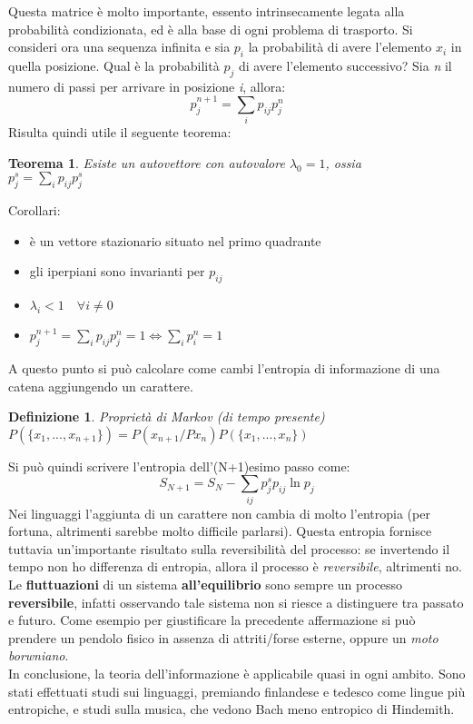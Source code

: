 \documentclass[12pt, a4paper]{article}
\theoremstyle{theorem}
\newtheorem{definition}{Definizione}[section]
\newtheorem{theorem}{Teorema}[section]
\begin{document}
		Questa matrice è molto importante, essento intrinsecamente legata alla probabilità condizionata, ed è alla base di ogni problema di trasporto.
		Si consideri ora una sequenza infinita e sia $p_i$ la probabilità di avere l'elemento $x_i$ in quella posizione.
		Qual è la probabilità $p_j$ di avere l'elemento successivo?
		Sia \textit{n} il numero di passi per arrivare in posizione \textit{i}, allora:
		\begin{equation}
			p_j^{n+1}=\sum_ip_{ij}p_j^n
		\end{equation}
		Risulta quindi utile il seguente teorema:
		\begin{theorem}
			Esiste un autovettore con autovalore $\lambda_0=1$, ossia\\
			$p_j^s=\sum_ip_{ij}p_j^s$
		\end{theorem}
		Corollari:
		\begin{itemize}
			\item è un vettore stazionario situato nel primo quadrante
			\item gli iperpiani sono invarianti per $p_{ij}$
			\item $\lambda_i<1\quad\forall i\neq 0$
			\item $p_j^{n+1}=\sum_ip_{ij}p_j^n=1\Leftrightarrow\sum_ip_i^n=1$
		\end{itemize}
		A questo punto si può calcolare come cambi l'entropia di informazione di una catena aggiungendo un carattere.
		\begin{definition}
			Proprietà di Markov (di tempo presente)\\
			$P(\{x_1,...,x_{n+1}\})=P(x_{n+1}/Px_n)P(\{x_1,...,x_{n}\})$
		\end{definition}
		Si può quindi scrivere l'entropia dell'(N+1)esimo passo come:
		\begin{equation}
			S_{N+1}=S_N-\sum_{ij}p_j^sp_{ij}\ln p_j
		\end{equation}
		Nei linguaggi l'aggiunta di un carattere non cambia di molto l'entropia (per fortuna, altrimenti sarebbe molto difficile parlarsi).
		Questa entropia fornisce tuttavia un'importante risultato sulla reversibilità del processo:
		se invertendo il tempo non ho differenza di entropia, allora il processo è \textit{reversibile}, altrimenti no.
		Le \textbf{fluttuazioni} di un sistema \textbf{all'equilibrio} sono sempre un processo \textbf{reversibile}, infatti osservando tale sistema non si riesce a distinguere tra passato e futuro.
		Come esempio per giustificare la precedente affermazione si può prendere un pendolo fisico in assenza di attriti/forse esterne, oppure un \textit{moto borwniano}.\\
		In conclusione, la teoria dell'informazione è applicabile quasi in ogni ambito.
		Sono stati effettuati studi sui linguaggi, premiando finlandese e tedesco come lingue più entropiche, e studi sulla musica, che vedono Bach meno entropico di Hindemith.
\end{document}
